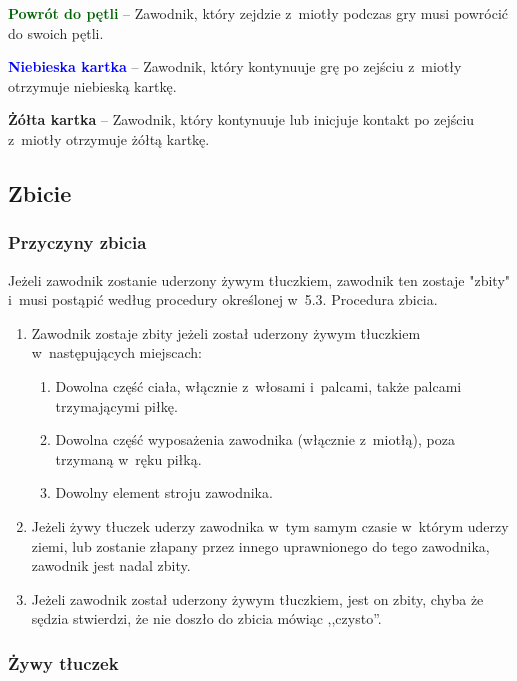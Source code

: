 \documentclass[12pt,a4paper]{article}
\newcommand\yellowcard[1]{\bgroup\textcolor{darkyellow}{\textbf{#1}}}
\newcommand\bluecard[1]{\bgroup\textcolor{blue}{\textbf{#1}}}
\newcommand\other[1]{\bgroup\textcolor{darkgreen}{\textbf{#1}}}
\begin{document}
\other{Powrót do pętli} -- Zawodnik, który zejdzie z~miotły podczas gry
musi powrócić do swoich pętli.

\bluecard{Niebieska kartka} -- Zawodnik, który kontynuuje grę po zejściu z~miotły otrzymuje niebieską kartkę.

\yellowcard{Żółta kartka} -- Zawodnik, który kontynuuje lub inicjuje kontakt po
zejściu z~miotły otrzymuje żółtą kartkę.

\subsection{Zbicie}

\subsubsection{Przyczyny zbicia}

Jeżeli zawodnik zostanie uderzony żywym tłuczkiem, zawodnik ten zostaje
"zbity" i~musi postąpić
według procedury określonej w~5.3. Procedura zbicia.

\begin{enumerate}
	\item
	      Zawodnik zostaje zbity jeżeli został uderzony żywym tłuczkiem w~następujących miejscach:

	      \begin{enumerate}
		      \item
		            Dowolna część ciała, włącznie z~włosami i~palcami, także palcami
		            trzymającymi piłkę.
		      \item
		            Dowolna część wyposażenia zawodnika (włącznie z~miotłą), poza
		            trzymaną w~ręku piłką.
		      \item
		            Dowolny element stroju zawodnika.
	      \end{enumerate}
	\item
	      Jeżeli żywy tłuczek uderzy zawodnika w~tym samym czasie w~którym
	      uderzy ziemi, lub zostanie złapany przez innego uprawnionego do tego
	      zawodnika, zawodnik jest nadal zbity.
	\item
	      Jeżeli zawodnik został uderzony żywym tłuczkiem, jest on zbity, chyba
	      że sędzia stwierdzi, że nie doszło do zbicia mówiąc ,,czysto''.
\end{enumerate}

\subsubsection{Żywy tłuczek}
\end{document}
